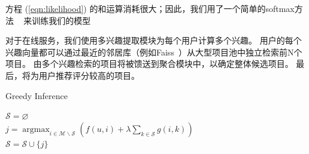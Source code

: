 方程 (\ref{eqn:likelihood}) 的和运算消耗很大；因此，我们用了一个简单的softmax方法 ~\cite{jean2014using, covington2016deep} 来训练我们的模型

对于在线服务，我们使用多兴趣提取模块为每个用户计算多个兴趣。 用户的每个兴趣向量都可以通过最近的邻居库（例如Faiss~\cite {JDH17}）从大型项目池中独立检索前N个项目。 由多个兴趣检索的项目将被馈送到聚合模块中，以确定整体候选项目。 最后，将为用户推荐评分较高的项目。




\begin{algorithm}[t]
	\caption{Greedy Inference \label{algo:greedy_infer}}
	$\mathcal{S} = \varnothing$ \\
     {
        $j = \operatorname{argmax}_{i \in \mathcal{M} \backslash \mathcal{S}} \left( f(u, i) + \lambda \sum_{k \in \mathcal{S}} g(i,k) \right)$ \\
        $\mathcal{S} = \mathcal{S} \cup \{j\}$
    }
\end{algorithm}

